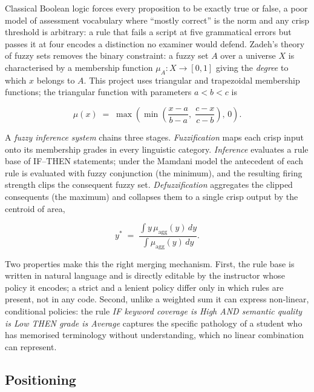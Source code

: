 \documentclass[11pt,a4paper]{article}
\begin{document}
Classical Boolean logic forces every proposition to be exactly true or false,
a poor model of assessment vocabulary where ``mostly correct'' is the norm and any
crisp threshold is arbitrary: a rule that fails a script at five grammatical
errors but passes it at four encodes a distinction no examiner would defend.
Zadeh's theory of fuzzy sets \cite{zadeh1965} removes the binary constraint: a
fuzzy set $A$ over a universe $X$ is characterised by a membership function
$\mu_A : X \rightarrow [0,1]$ giving the \emph{degree} to which $x$ belongs to
$A$. This project uses triangular and trapezoidal membership functions; the
triangular function with parameters $a<b<c$ is

\begin{equation}
\mu(x) \;=\; \max\!\left( \min\!\left( \frac{x-a}{b-a},\; \frac{c-x}{c-b} \right),\, 0 \right).
\end{equation}

A \emph{fuzzy inference system} chains three stages. \emph{Fuzzification} maps
each crisp input onto its membership grades in every linguistic category.
\emph{Inference} evaluates a rule base of IF--THEN statements; under the Mamdani
model \cite{mamdani1975} the antecedent of each rule is evaluated with fuzzy
conjunction (the minimum), and the resulting firing strength clips the consequent
fuzzy set. \emph{Defuzzification} aggregates the clipped consequents (the maximum)
and collapses them to a single crisp output by the centroid of area,

\begin{equation}
y^{*} \;=\; \frac{\displaystyle\int y \,\mu_{\mathrm{agg}}(y)\,dy}
                 {\displaystyle\int \mu_{\mathrm{agg}}(y)\,dy}.
\end{equation}

Two properties make this the right merging mechanism. First, the rule base is
written in natural language and is directly editable by the instructor whose
policy it encodes; a strict and a lenient policy differ only in which rules are
present, not in any code. Second, unlike a weighted sum it can express
non-linear, conditional policies: the rule \emph{IF keyword coverage is High AND
semantic quality is Low THEN grade is Average} captures the specific pathology of
a student who has memorised terminology without understanding, which no linear
combination can represent.

\subsection{Positioning}
\end{document}
